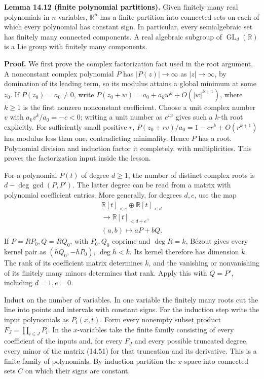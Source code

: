 \documentclass[
  11pt,
]{article}
\begin{document}
\textbf{Lemma 14.12 (finite polynomial partitions).} Given finitely many
real polynomials in \(n\) variables, \(\mathbb R^n\) has a finite
partition into connected sets on each of which every polynomial has
constant sign. In particular, every semialgebraic set has finitely many
connected components. A real algebraic subgroup of
\(\operatorname{GL}_d(\mathbb R)\) is a Lie group with finitely many
components.

\textbf{Proof.} We first prove the complex factorization fact used in
the root argument. A nonconstant complex polynomial \(P\) has
\(|P(z)|\to\infty\) as \(|z|\to\infty\), by domination of its leading
term, so its modulus attains a global minimum at some \(z_0\). If
\(P(z_0)=a_0\ne0\), write \(P(z_0+w)=a_0+a_kw^k+O(|w|^{k+1})\), where
\(k\ge1\) is the first nonzero nonconstant coefficient. Choose a unit
complex number \(v\) with \(a_kv^k/a_0=-c<0\); writing a unit number as
\(e^{i\varphi}\) gives such a \(k\)-th root explicitly. For sufficiently
small positive \(r\), \(P(z_0+rv)/a_0=1-cr^k+O(r^{k+1})\) has modulus
less than one, contradicting minimality. Hence \(P\) has a root.
Polynomial division and induction factor it completely, with
multiplicities. This proves the factorization input inside the lesson.

For a polynomial \(P(t)\) of degree \(d\geq1\), the number of distinct
complex roots is \(d-\deg\gcd(P,P')\). The latter degree can be read
from a matrix with polynomial coefficient entries. More generally, for
degrees \(d,e\), use the map \[
\begin{gathered}
\mathbb R[t]_{<e}\oplus\mathbb R[t]_{<d}
\\ \longrightarrow\mathbb R[t]_{<d+e},\\
(a,b)\longmapsto aP+bQ.
\end{gathered}
\tag{14.51}
\] If \(P=RP_0,Q=RQ_0\), with \(P_0,Q_0\) coprime and \(\deg R=k\),
Bézout gives every kernel pair as \((hQ_0,-hP_0)\), \(\deg h<k\). Its
kernel therefore has dimension \(k\). The rank of its coefficient matrix
determines \(k\), and the vanishing or nonvanishing of its finitely many
minors determines that rank. Apply this with \(Q=P'\), including
\(d=1,e=0\).

Induct on the number of variables. In one variable the finitely many
roots cut the line into points and intervals with constant signs. For
the induction step write the input polynomials as \(P_i(x,t)\). Form
every nonempty subset product \(F_J=\prod_{i\in J}P_i\). In the
\(x\)-variables take the finite family consisting of every coefficient
of the inputs and, for every \(F_J\) and every possible truncated
degree, every minor of the matrix (14.51) for that truncation and its
derivative. This is a finite family of polynomials. By induction
partition the \(x\)-space into connected sets \(C\) on which their signs
are constant.
\end{document}
